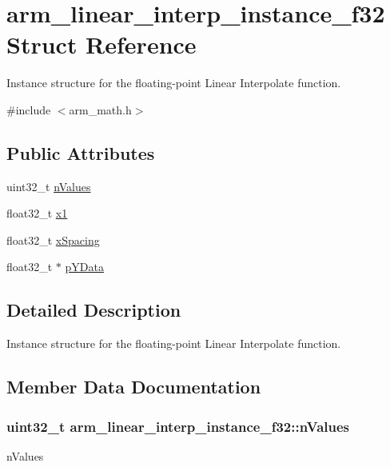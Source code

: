 \hypertarget{structarm__linear__interp__instance__f32}{}\section{arm\+\_\+linear\+\_\+interp\+\_\+instance\+\_\+f32 Struct Reference}
\label{structarm__linear__interp__instance__f32}


Instance structure for the floating-\/point Linear Interpolate function.  




{\ttfamily \#include $<$arm\+\_\+math.\+h$>$}

\subsection*{Public Attributes}
\begin{DoxyCompactItemize}
\item 
uint32\+\_\+t \hyperlink{structarm__linear__interp__instance__f32_a95f02a926b16d35359aca5b31e813b11}{n\+Values}
\item 
float32\+\_\+t \hyperlink{structarm__linear__interp__instance__f32_a08352dc6ea82fbc0827408e018535481}{x1}
\item 
float32\+\_\+t \hyperlink{structarm__linear__interp__instance__f32_aa8e2d686b5434a406d390b347b183511}{x\+Spacing}
\item 
float32\+\_\+t $\ast$ \hyperlink{structarm__linear__interp__instance__f32_ab373001f6afad0850359c344a4d7eee4}{p\+Y\+Data}
\end{DoxyCompactItemize}


\subsection{Detailed Description}
Instance structure for the floating-\/point Linear Interpolate function. 

\subsection{Member Data Documentation}
\subsubsection[{\texorpdfstring{n\+Values}{nValues}}]{\setlength{\rightskip}{0pt plus 5cm}uint32\+\_\+t arm\+\_\+linear\+\_\+interp\+\_\+instance\+\_\+f32\+::n\+Values}\hypertarget{structarm__linear__interp__instance__f32_a95f02a926b16d35359aca5b31e813b11}{}\label{structarm__linear__interp__instance__f32_a95f02a926b16d35359aca5b31e813b11}
n\+Values 
